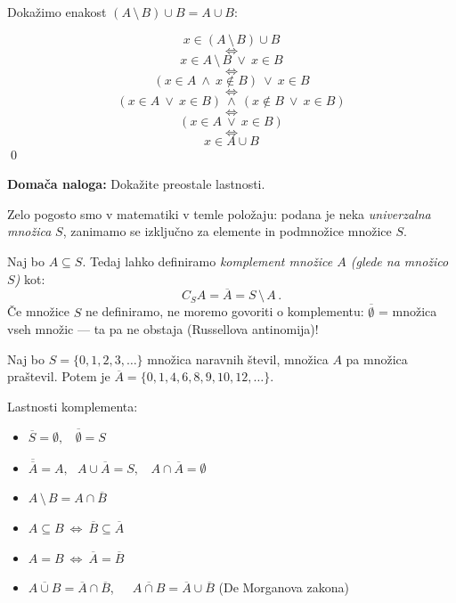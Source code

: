 \documentclass[11pt,paper=b5,footinclude,headinclude]{scrbook} %
\newcounter{example}
\def\ali {{~\vee~}}
\def\inn {{~\wedge~}}
\def\brez {{\,\setminus\,}}
\def\cee {{~\Leftrightarrow~}}
\begin{document}
Dokažimo enakost $(A\brez B)\cup B = A\cup B$:

$$x\in (A\brez B)\cup B$$
$$\cee$$
$$x\in A\brez B \ali x\in B$$
$$\cee$$
$$(x\in A\inn x\not\in B) \ali x\in B$$
$$\cee$$
$$(x\in A\ali x\in B) \inn (x\not\in B \ali x\in B)$$
$$\cee$$
$$(x\in A\ali x\in B)$$
$$\cee$$
$$x\in A\cup B$$
\qed

\bigskip
\textbf{ Domača naloga:} Dokažite preostale lastnosti.

\bigskip



\bigskip

Zelo pogosto smo v matematiki v temle položaju: podana je neka {\em univerzalna množica} $S$, zanimamo se izključno za elemente in podmnožice množice $S$.

Naj bo $A\subseteq S$. Tedaj lahko definiramo {\em komplement množice $A$ (glede na množico $S$)} kot:
$$C_SA = \overline A = S\brez A\,.$$
Če množice $S$ ne definiramo, ne moremo govoriti o komplementu: $\overline \emptyset$ = množica vseh množic --- ta pa ne obstaja (Russellova antinomija)!

\bigskip
\begin{example*}
Naj bo $S = \{0,1,2,3,\ldots\}$ množica naravnih števil, množica $A$ pa množica praštevil.
Potem je $\overline A = \{0,1,4,6,8,9,10,12,\ldots\}$.

\end{example*}

\medskip

Lastnosti komplementa:
\begin{itemize}
  \item
$\overline S = \emptyset,~~~~\overline \emptyset = S$

  \item
$\overline{\overline A} = A,~~~A\cup \overline A = S,~~~~A\cap \overline A = \emptyset$

  \item
$A\brez B = A\cap \overline B$

  \item
$A\subseteq B \cee  \overline B \subseteq \overline A$

  \item
$A= B \cee  \overline A = \overline B$

  \item
$\overline{A\cup B} = \overline A\cap \overline B$,~~~$\overline{A\cap B} = \overline A\cup \overline B$ (De Morganova zakona)
\end{itemize}
\end{document}
